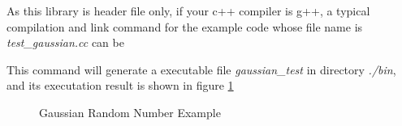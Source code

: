 As this library is header file only,
if your c++ compiler is g++, a typical compilation and link command for the example code whose file name is \textit{test\_gaussian.cc} can be

\begin{center}
\end{center}

This command will generate a executable file \textit{gaussian\_test} in directory \textit{./bin},
and its executation result is shown in figure \ref{fig:gaussian}

\begin{figure}
\centering
{}
\caption{Gaussian Random Number Example}
\label{fig:gaussian}
\end{figure}










